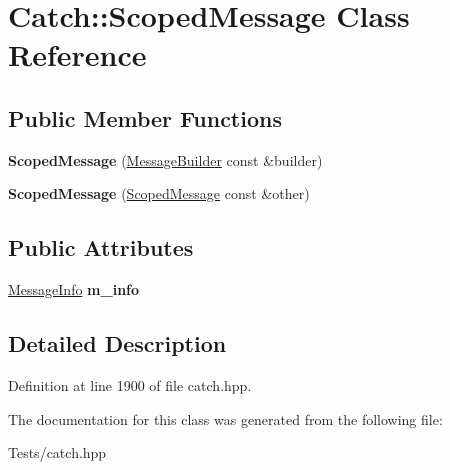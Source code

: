\hypertarget{class_catch_1_1_scoped_message}{}\section{Catch\+:\+:Scoped\+Message Class Reference}
\label{class_catch_1_1_scoped_message}
\subsection*{Public Member Functions}
\begin{DoxyCompactItemize}
\item 
\mbox{\label{class_catch_1_1_scoped_message_a5cc59f0f2ebe840e6607f83004d49a17}} 
{\bfseries Scoped\+Message} (\hyperlink{struct_catch_1_1_message_builder}{Message\+Builder} const \&builder)
\item 
\mbox{\label{class_catch_1_1_scoped_message_ae03a17fd47220d563d4abc73e7518e29}} 
{\bfseries Scoped\+Message} (\hyperlink{class_catch_1_1_scoped_message}{Scoped\+Message} const \&other)
\end{DoxyCompactItemize}
\subsection*{Public Attributes}
\begin{DoxyCompactItemize}
\item 
\mbox{\label{class_catch_1_1_scoped_message_ae6e1476f389cc6e1586f033b3747b27b}} 
\hyperlink{struct_catch_1_1_message_info}{Message\+Info} {\bfseries m\+\_\+info}
\end{DoxyCompactItemize}


\subsection{Detailed Description}


Definition at line 1900 of file catch.\+hpp.



The documentation for this class was generated from the following file\+:\begin{DoxyCompactItemize}
\item 
Tests/catch.\+hpp\end{DoxyCompactItemize}
